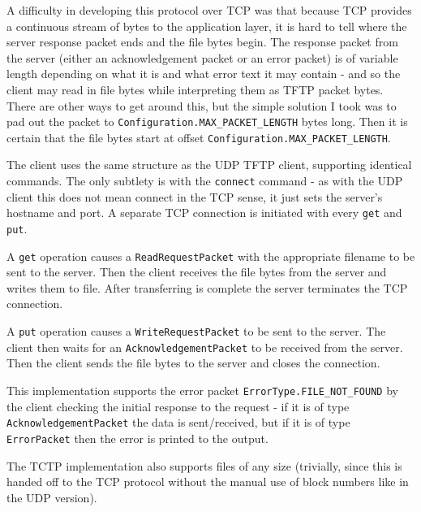 \documentclass[a4paper]{article}
\newcommand{\code}{\texttt}
\begin{document}
A difficulty in developing this protocol over TCP was that because TCP provides a continuous stream of bytes to the application layer, it is hard to tell where the server response packet ends and the file bytes begin. The response packet from the server (either an acknowledgement packet or an error packet) is of variable length depending on what it is and what error text it may contain - and so the client may read in file bytes while interpreting them as TFTP packet bytes. There are other ways to get around this, but the simple solution I took was to pad out the packet to \code{Configuration.MAX\_PACKET\_LENGTH} bytes long. Then it is certain that the file bytes start at offset \code{Configuration.MAX\_PACKET\_LENGTH}.

The client uses the same structure as the UDP TFTP client, supporting identical commands. The only subtlety is with the \code{connect} command - as with the UDP client this does not mean connect in the TCP sense, it just sets the server's hostname and port. A separate TCP connection is initiated with every \code{get} and \code{put}.

A \code{get} operation causes a \code{ReadRequestPacket} with the appropriate filename to be sent to the server. Then the client receives the file bytes from the server and writes them to file. After transferring is complete the server terminates the TCP connection.

A \code{put} operation causes a \code{WriteRequestPacket} to be sent to the server. The client then waits for an \code{AcknowledgementPacket} to be received from the server. Then the client sends the file bytes to the server and closes the connection. 

This implementation supports the error packet \code{ErrorType.FILE\_NOT\_FOUND} by the client checking the initial response to the request - if it is of type \code{AcknowledgementPacket} the data is sent/received, but if it is of type \code{ErrorPacket} then the error is printed to the output.

The TCTP implementation also supports files of any size (trivially, since this is handed off to the TCP protocol without the manual use of block numbers like in the UDP version).
\end{document}
